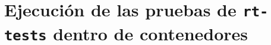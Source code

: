 \chapter{Ejecución de las pruebas de \texttt{rt-tests} dentro de contenedores}
\label{app:03-container_tests}